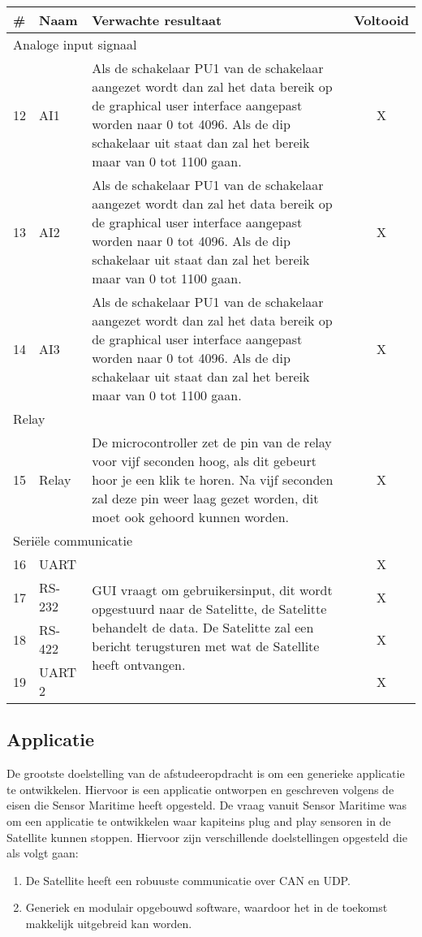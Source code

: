 \newpage
\begin{table}[h!]
	\begin{tabular}{llp{12.25cm}c}
	\toprule
	\textbf{\#}	& \textbf{Naam} & \textbf{Verwachte resultaat} & \textbf{Voltooid}\\ \toprule
	\multicolumn{4}{l}{Analoge input signaal} \\ \midrule 
	12 			& AI1			& Als de schakelaar PU1 van de schakelaar aangezet wordt dan zal het data bereik op de graphical user interface aangepast worden naar 0 tot 4096. Als de dip schakelaar uit staat dan zal het bereik maar van 0 tot 1100 gaan. & X\\
	13 			& AI2			& Als de schakelaar PU1 van de schakelaar aangezet wordt dan zal het data bereik op de graphical user interface aangepast worden naar 0 tot 4096. Als de dip schakelaar uit staat dan zal het bereik maar van 0 tot 1100 gaan. & X\\
	14 			& AI3			& Als de schakelaar PU1 van de schakelaar aangezet wordt dan zal het data bereik op de graphical user interface aangepast worden naar 0 tot 4096. Als de dip schakelaar uit staat dan zal het bereik maar van 0 tot 1100 gaan. & X\\ \midrule
	\multicolumn{4}{l}{Relay} \\ \midrule
	15 			& Relay			& De microcontroller zet de pin van de relay voor vijf seconden hoog, als dit gebeurt hoor je een klik te horen. Na vijf seconden zal deze pin weer laag gezet worden, dit moet ook gehoord kunnen worden. & X \\ \midrule
	\multicolumn{4}{l}{Seriële communicatie} \\ \midrule
	16 			& UART			& \multirow{4}{12.25cm}{GUI vraagt om gebruikersinput, dit wordt opgestuurd naar de Satelitte, de Satelitte behandelt de data. De Satelitte zal een bericht terugsturen met wat de Satellite heeft ontvangen.} & X \\
	17 			& RS-232		& & X \\
	18 			& RS-422		& & X \\
	19 			& UART 2		& & X \\  \bottomrule
	\end{tabular}
\end{table}


\subsection{Applicatie}
De grootste doelstelling van de afstudeeropdracht is om een generieke applicatie te ontwikkelen. Hiervoor is een applicatie ontworpen en geschreven volgens de eisen die Sensor Maritime heeft opgesteld. De vraag vanuit Sensor Maritime was om een applicatie te ontwikkelen waar kapiteins plug and play sensoren in de Satellite kunnen stoppen. Hiervoor zijn verschillende doelstellingen opgesteld die als volgt gaan:
\begin{enumerate}
	\item De Satellite heeft een robuuste communicatie over CAN en UDP.
	\item Generiek en modulair opgebouwd software, waardoor het in de toekomst makkelijk uitgebreid kan worden.
\end{enumerate}

